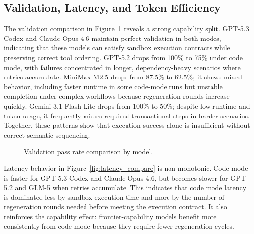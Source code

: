 \documentclass[journal,article,submit,pdftex,moreauthors]{Definitions/mdpi}
\begin{document}
\subsection{Validation, Latency, and Token Efficiency}

The validation comparison in Figure~\ref{fig:validation_rate} reveals a strong capability split. GPT-5.3 Codex and Claude Opus 4.6 maintain perfect validation in both modes, indicating that these models can satisfy sandbox execution contracts while preserving correct tool ordering. GPT-5.2 drops from 100\% to 75\% under code mode, with failures concentrated in longer, dependency-heavy scenarios where retries accumulate. MiniMax M2.5 drops from 87.5\% to 62.5\%; it shows mixed behavior, including faster runtime in some code-mode runs but unstable completion under complex workflows because regeneration rounds increase quickly. Gemini 3.1 Flash Lite drops from 100\% to 50\%; despite low runtime and token usage, it frequently misses required transactional steps in harder scenarios. Together, these patterns show that execution success alone is insufficient without correct semantic sequencing.

\begin{figure}[H]
\centering
{}
\caption{Validation pass rate comparison by model.\label{fig:validation_rate}}
\end{figure}

Latency behavior in Figure~\ref{fig:latency_compare} is non-monotonic. Code mode is faster for GPT-5.3 Codex and Claude Opus 4.6, but becomes slower for GPT-5.2 and GLM-5 when retries accumulate. This indicates that code mode latency is dominated less by sandbox execution time and more by the number of regeneration rounds needed before meeting the execution contract. It also reinforces the capability effect: frontier-capability models benefit more consistently from code mode because they require fewer regeneration cycles.
\end{document}
